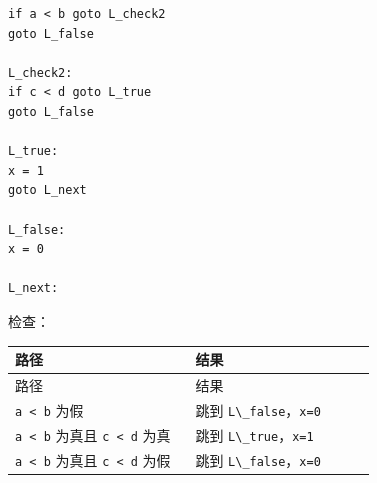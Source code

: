\documentclass[UTF8]{ctexart}
\begin{document}
\begin{Verbatim}[fontsize=\small,breaklines=true]
if a < b goto L_check2
goto L_false

L_check2:
if c < d goto L_true
goto L_false

L_true:
x = 1
goto L_next

L_false:
x = 0

L_next:
\end{Verbatim}

检查：

\begin{longtable}{|p{0.47\linewidth}|p{0.47\linewidth}|}
\hline
路径 & 结果 \\
\hline
\endfirsthead
路径 & 结果 \\
\hline
\endhead
\texttt{a < b} 为假 & 跳到 \texttt{L\textbackslash{}\_false}，\texttt{x=0} \\
\hline
\texttt{a < b} 为真且 \texttt{c < d} 为真 & 跳到 \texttt{L\textbackslash{}\_true}，\texttt{x=1} \\
\hline
\texttt{a < b} 为真且 \texttt{c < d} 为假 & 跳到 \texttt{L\textbackslash{}\_false}，\texttt{x=0} \\
\hline
\end{longtable}
\end{document}

